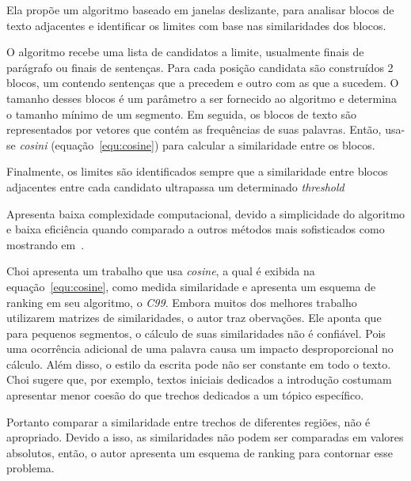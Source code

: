 Ela propõe um algoritmo baseado em janelas deslizante, para analisar blocos de texto adjacentes e identificar os limites com base nas similaridades dos blocos.

O algoritmo recebe uma lista de candidatos a limite, usualmente finais de parágrafo ou finais de sentenças. Para cada posição candidata são construídos 2 blocos, um contendo sentenças que a precedem e outro com as que a sucedem. O tamanho desses blocos é um parâmetro a ser fornecido ao algoritmo e determina o tamanho mínimo de um segmento.
%
Em seguida, os blocos de texto são representados por vetores que contém as frequências de suas palavras. Então, usa-se \textit{cosini} (equação~\ref{equ:cosine}) para calcular a similaridade entre os blocos.

Finalmente, os limites são identificados sempre que a similaridade entre blocos adjacentes entre cada candidato ultrapassa um determinado \textit{threshold}

Apresenta baixa complexidade computacional, devido a simplicidade do algoritmo e baixa eficiência quando comparado a outros métodos mais sofisticados como mostrando em~\cite{Choi2000, Kern2009}.








Choi \cite{Choi2000} apresenta um trabalho que usa \textit{cosine}, a qual é exibida na equação~\ref{equ:cosine}, como medida similaridade e apresenta um esquema de ranking em seu algoritmo, o \textit{C99}. 
%
Embora muitos dos melhores trabalho utilizarem matrizes de similaridades, o autor traz obervações.
%
Ele aponta que para pequenos segmentos, o cálculo de suas similaridades não é confiável. Pois uma ocorrência adicional de uma palavra causa um impacto desproporcional no cálculo.
%
Além disso, o estilo da escrita pode não ser constante em todo o texto. Choi sugere que, por exemplo, textos iniciais dedicados a introdução costumam apresentar menor coesão do que trechos dedicados a um tópico específico. 
%

Portanto comparar a similaridade entre trechos de diferentes regiões, não é apropriado.
Devido a isso, as similaridades não podem ser comparadas em valores absolutos,  então, o autor apresenta um esquema de ranking para contornar esse problema.
%




